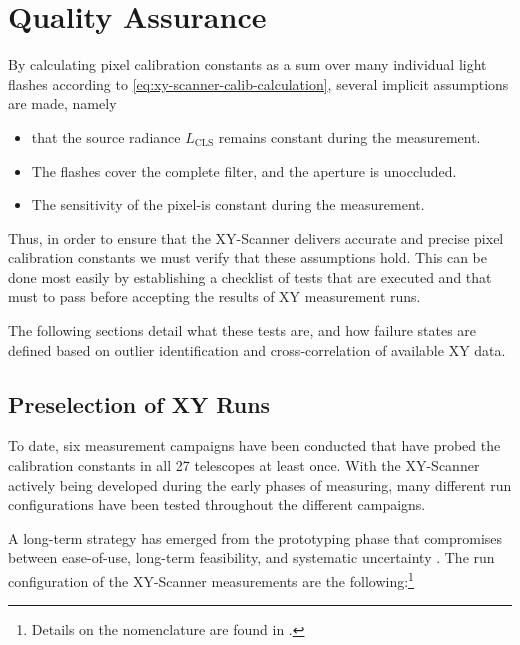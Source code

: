 \section{Quality Assurance}
\label{sec:quality-assurance}

By calculating \FD pixel calibration constants as a sum over many individual 
light flashes according to \cref{eq:xy-scanner-calib-calculation}, several
implicit assumptions are made, namely

\vspace{0.2cm}
\begingroup
\renewcommand\arraystretch{1.3}
\begin{itemize}
\item that the source radiance $L_\mathrm{CLS}$ remains constant during the 
measurement.
\item The \CLS flashes cover the complete filter, and the aperture is 
unoccluded.
\item The sensitivity of the \FD pixel-\PMTs is constant during the 
measurement.
\end{itemize}
\endgroup
\vspace{0.2cm}

Thus, in order to ensure that the XY-Scanner delivers accurate and precise 
pixel calibration constants we must verify that these assumptions hold. This 
can be done most easily by establishing a checklist of tests that are executed 
and that must to pass before accepting the results of XY measurement runs.

The following sections detail what these tests are, and how failure states are 
defined based on outlier identification and cross-correlation of available XY
data.

\subsection{Preselection of XY Runs}
\label{ssec:xy-qa-run-selection}

To date, six measurement campaigns have been conducted that have probed the
calibration constants in all 27 telescopes at least once. With the XY-Scanner 
actively being developed during the early phases of measuring, many different 
run configurations have been tested throughout the different campaigns. 

A long-term strategy has emerged from the prototyping phase that compromises 
between ease-of-use, long-term feasibility, and systematic uncertainty 
\cite{filipQualityAssuranceXY2024}. The run configuration of the XY-Scanner 
measurements are the following:\footnote{Details on the nomenclature are found in 
\cite{schaferXYScannerVersatileMethod2023}.}

